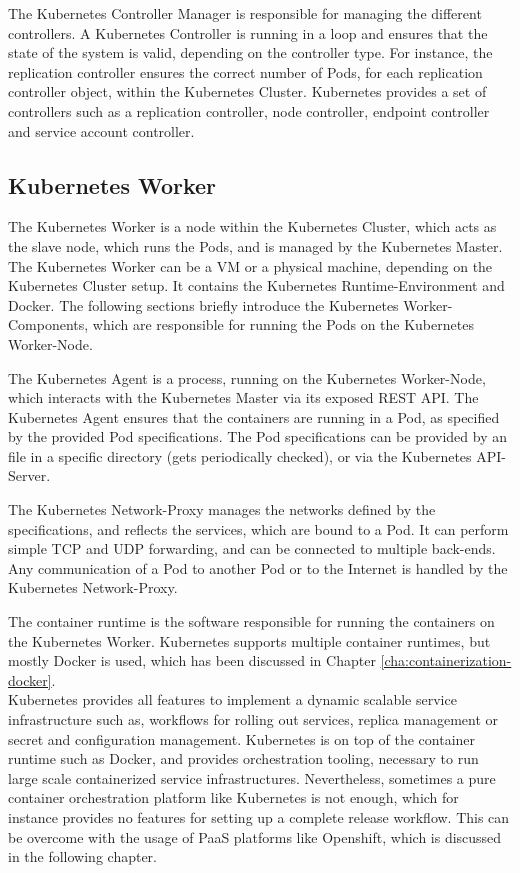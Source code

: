 The Kubernetes Controller Manager is responsible for managing the different controllers. A Kubernetes Controller is running in a loop and ensures that the state of the system is valid, depending on the controller type. For instance, the replication controller ensures the correct number of Pods, for each replication controller object, within the Kubernetes Cluster. Kubernetes provides a set of controllers such as a replication controller, node controller, endpoint controller and service account controller.

\subsection{Kubernetes Worker}
\label{sec:caas-kubernetes-worker}
The Kubernetes Worker is a node within the Kubernetes Cluster, which acts as the slave node, which runs the Pods, and is managed by the Kubernetes Master. The Kubernetes Worker can be a VM or a physical machine, depending on the Kubernetes Cluster setup. It contains the Kubernetes Runtime-Environment and Docker. The following sections briefly introduce the Kubernetes Worker-Components, which are responsible for running the Pods on the Kubernetes Worker-Node\cite{CNCFKubernetesComponents2018}. 

The Kubernetes Agent is a process, running on the Kubernetes Worker-Node, which interacts with the Kubernetes Master via its exposed REST API. The Kubernetes Agent ensures that the containers are running in a Pod, as specified by the provided Pod specifications. The Pod specifications can be provided by an file in a specific directory (gets periodically checked), or via the Kubernetes API-Server.

The Kubernetes Network-Proxy manages the networks defined by the specifications, and reflects the services, which are bound to a Pod. It can perform simple TCP and UDP forwarding, and can be connected to multiple back-ends. Any communication of a Pod to another Pod or to the Internet is handled by the Kubernetes Network-Proxy. 

The container runtime is the software responsible for running the containers on the Kubernetes Worker. Kubernetes supports multiple container runtimes, but mostly  Docker is used, which has been discussed in Chapter \vref{cha:containerization-docker}. \\

Kubernetes provides all features to implement a dynamic scalable service infrastructure such as, workflows for rolling out services, replica management or secret and configuration management. Kubernetes is on top of the container runtime such as Docker, and provides orchestration tooling, necessary to run large scale containerized service infrastructures. Nevertheless, sometimes a pure container orchestration platform like Kubernetes is not enough, which for instance provides no features for setting up a complete release workflow. This can be overcome with the usage of PaaS platforms like Openshift, which is discussed in the following chapter.
